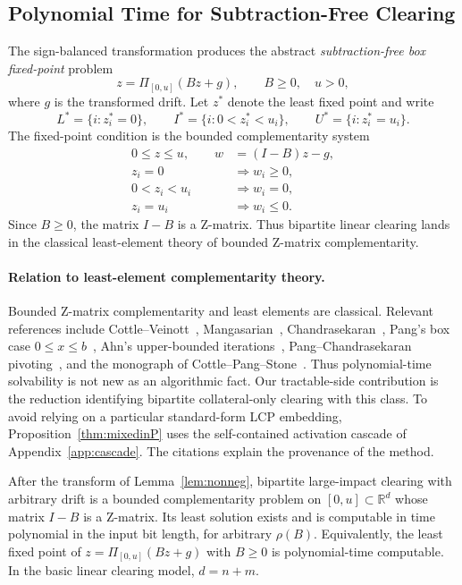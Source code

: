 \documentclass{llncs}
\newcommand{\clip}{\Pi}
\newcommand{\R}{\mathbb{R}}
\begin{document}
\subsection{Polynomial Time for Subtraction-Free Clearing}
\label{sec:nonnegdrift}

The sign-balanced transformation produces the abstract \emph{subtraction-free box fixed-point} problem
\[
        z=\clip_{[0,u]}(Bz+g),\qquad B\ge0,\quad u>0,
\]
where \(g\) is the transformed drift.  Let \(z^\ast\) denote the least fixed point and write
\[
        L^\ast=\{i:z^\ast_i=0\},\qquad
        I^\ast=\{i:0<z^\ast_i<u_i\},\qquad
        U^\ast=\{i:z^\ast_i=u_i\}.
\]
The fixed-point condition is the bounded complementarity system
\[
\begin{aligned}
0\le z\le u,\qquad w&=(I-B)z-g,\\
z_i=0&\Rightarrow w_i\ge0,\\
0<z_i<u_i&\Rightarrow w_i=0,\\
z_i=u_i&\Rightarrow w_i\le0 .
\end{aligned}
\]
Since \(B\ge0\), the matrix \(I-B\) is a Z-matrix. Thus bipartite linear clearing lands in the classical least-element theory of bounded Z-matrix complementarity.

\paragraph{Relation to least-element complementarity theory.}
Bounded Z-matrix complementarity and least elements are classical. Relevant references include Cottle--Veinott~\cite{CottleVeinott1972}, Mangasarian~\cite{Mangasarian1976}, Chandrasekaran~\cite{Chandrasekaran1970}, Pang's box case \(0\le x\le b\)~\cite{Pang1979}, Ahn's upper-bounded iterations~\cite{Ahn1983}, Pang--Chandrasekaran pivoting~\cite{PangChandrasekaran1985}, and the monograph of Cottle--Pang--Stone~\cite{CottlePangStone1992}. Thus polynomial-time solvability is not new as an algorithmic fact. Our tractable-side contribution is the reduction identifying bipartite collateral-only clearing with this class. To avoid relying on a particular standard-form LCP embedding, Proposition~\ref{thm:mixedinP} uses the self-contained activation cascade of Appendix~\ref{app:cascade}. The citations explain the provenance of the method.

\begin{proposition}
\label{thm:mixedinP}
After the transform of Lemma~\ref{lem:nonneg}, bipartite large-impact clearing with arbitrary drift is a bounded complementarity problem on \([0,u]\subset\R^d\) whose matrix \(I-B\) is a Z-matrix. Its least solution exists and is computable in time polynomial in the input bit length, for arbitrary \(\rho(B)\). Equivalently, the least fixed point of \(z=\clip_{[0,u]}(Bz+g)\) with \(B\ge0\) is polynomial-time computable. In the basic linear clearing model, \(d=n+m\).
\end{proposition}
\end{document}
